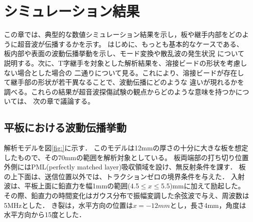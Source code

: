 \chapter{シミュレーション結果}
この章では、典型的な数値シミュレーション結果を示し，板や継手内部をどのように超音波が伝播するかを示す。
はじめに、もっとも基本的なケースである、板内部や表面の波動伝播挙動を示し、モード変換や散乱波の発生状況
について説明する。次に、T字継手を対象とした解析結果を、溶接ビードの形状を考慮しない場合とした場合の
二通りについて見る。これにより、溶接ビードが存在して継手部の形状が若干異なることで、波動伝播にどのような
違いが現れるかを調べる。これらの結果が超音波探傷試験の観点からどのような意味を持つかについては、
次の章で議論する。
\section{平板における波動伝播挙動}
解析モデルを図\ref{fig:}に示す．
このモデルは12mmの厚さの十分に大きな板を想定したもので、その70mmの範囲を解析対象としている。
板両端部の打ち切り位置外側にはPML(perfectly matched layer)吸収領域を設け、無反射条件を課す．
板の上下面は、送信位置以外では、トラクションゼロの境界条件を与えた．
入射波は、平板上面に鉛直力を幅1mmの範囲(4.5$\leq x \leq $5.5)mmに加えて励起した。
その際、鉛直力の時間変化はガウス分布で振幅変調した余弦波で与え、周波数は5MHzとした．
き裂は，水平方向の位置は$x=-12mm$とし，長さ4mm，角度は水平方向から15度とした．
